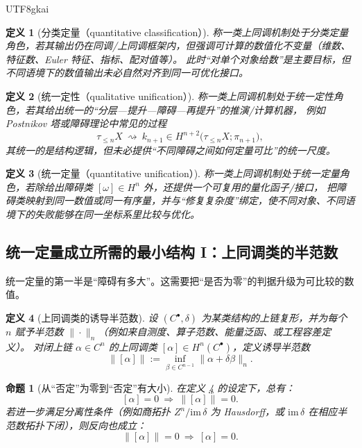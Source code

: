 \documentclass[12pt]{article}
\newtheorem{definition}{定义}[section]
\newtheorem{proposition}{命题}[section]
\begin{document}
\begin{CJK*}{UTF8}{gkai}
\begin{definition}[分类定量（quantitative classification）]
称一类上同调机制处于\emph{分类定量}角色，若其输出仍在同调/上同调框架内，但强调可计算的数值化不变量（维数、特征数、Euler 特征、指标、配对值等）。
此时“对单个对象给数”是主要目标，但不同语境下的数值输出未必自然对齐到同一可优化接口。
\end{definition}

\begin{definition}[统一定性（qualitative unification）]
称一类上同调机制处于\emph{统一定性}角色，若其给出统一的“分层—提升—障碍—再提升”的推演/计算机器，
例如 Postnikov 塔或障碍理论中常见的过程
\[
  \tau_{\le n}X\ \rightsquigarrow\ k_{n+1}\in H^{n+2}\bigl(\tau_{\le n}X;\pi_{n+1}\bigr),
\]
其统一的是结构逻辑，但未必提供“不同障碍之间如何定量可比”的统一尺度。
\end{definition}

\begin{definition}[统一定量（quantitative unification）]
称一类上同调机制处于\emph{统一定量}角色，若除给出障碍类 $[\omega]\in H^n$ 外，还提供一个可复用的量化函子/接口，
把障碍类映射到同一数值或同一有序量，并与“修复复杂度”绑定，使不同对象、不同语境下的失败能够在同一坐标系里比较与优化。
\end{definition}

\subsection{统一定量成立所需的最小结构 I：上同调类的半范数}

统一定量的第一半是“障碍有多大”。这需要把“是否为零”的判据升级为可比较的数值。

\begin{definition}[上同调类的诱导半范数]\label{def:cohomology-seminorm}
设 $(C^\bullet,\delta)$ 为某类结构的上链复形，并为每个 $n$ 赋予半范数 $\|\cdot\|_n$（例如来自测度、算子范数、能量泛函、或工程容差定义）。
对闭上链 $\alpha\in C^n$ 的上同调类 $[\alpha]\in H^n(C^\bullet)$，定义诱导半范数
\[
  \bigl\|[\alpha]\bigr\|
  :=
  \inf_{\beta\in C^{n-1}}
  \bigl\|\alpha+\delta\beta\bigr\|_n.
\]
\end{definition}

\begin{proposition}[从“否定”为零到“否定”有大小]\label{prop:seminorm-basic}
在定义 \ref{def:cohomology-seminorm} 的设定下，总有：
\[
  [\alpha]=0\ \Longrightarrow\ \bigl\|[\alpha]\bigr\|=0.
\]
若进一步满足分离性条件（例如商拓扑 $Z^n/\mathrm{im}\,\delta$ 为 Hausdorff，或 $\mathrm{im}\,\delta$ 在相应半范数拓扑下闭），则反向也成立：
\[
  \bigl\|[\alpha]\bigr\|=0\ \Longrightarrow\ [\alpha]=0.
\]
\end{proposition}


\end{CJK*}
\end{document}
